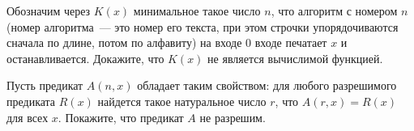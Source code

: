\begin{ptask}{31}
	Обозначим через $K(x)$ минимальное такое число $n$, что алгоритм с номером $n$ (номер алгоритма~--- это номер его текста, при
    этом строчки упорядочиваются сначала по длине, потом по алфавиту) на входе $0$ входе печатает $x$ и останавливается. Докажите,
    что $K(x)$ не является вычислимой функцией.
\end{ptask}

\begin{ptask}{32}
	Пусть предикат $A(n, x)$ обладает таким свойством: для любого разрешимого предиката $R(x)$ найдется такое натуральное число
    $r$, что $A(r, x) = R(x)$ для всех $x$. Покажите, что предикат $A$ не разрешим.
\end{ptask}
